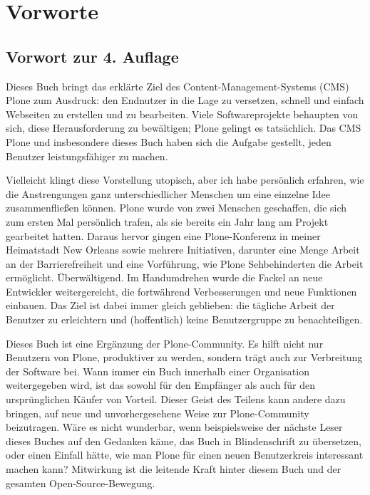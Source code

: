\documentclass[a4paper,12pt,ngerman]{manual}
\begin{document}
\resetcurrentobjects
\hypertarget{--doc-intro/intro}{}

\chapter{Vorworte}


\section{Vorwort zur 4. Auflage}

Dieses Buch bringt das erklärte Ziel des Content-Management-Systems (CMS)
Plone zum Ausdruck: den Endnutzer in die Lage zu versetzen, schnell und
einfach Webseiten zu erstellen und zu bearbeiten. Viele Softwareprojekte
behaupten von sich, diese Herausforderung zu bewältigen; Plone gelingt es
tatsächlich. Das CMS Plone und insbesondere dieses Buch haben sich die Aufgabe
gestellt, jeden Benutzer leistungsfähiger zu machen.

Vielleicht klingt diese Vorstellung utopisch, aber ich habe persönlich
erfahren, wie die Anstrengungen ganz unterschiedlicher Menschen um eine
einzelne Idee zusammenfließen können. Plone wurde von zwei Menschen
geschaffen, die sich zum ersten Mal persönlich trafen, als sie bereits ein
Jahr lang am Projekt gearbeitet hatten. Daraus hervor gingen eine
Plone-Konferenz in meiner Heimatstadt New Orleans sowie mehrere Initiativen,
darunter eine Menge Arbeit an der Barrierefreiheit und eine Vorführung, wie
Plone Sehbehinderten die Arbeit ermöglicht. Überwältigend. Im Handumdrehen
wurde die Fackel an neue Entwickler weitergereicht, die fortwährend
Verbesserungen und neue Funktionen einbauen. Das Ziel ist dabei immer gleich
geblieben: die tägliche Arbeit der Benutzer zu erleichtern und (hoffentlich)
keine Benutzergruppe zu benachteiligen.

Dieses Buch ist eine Ergänzung der Plone-Community. Es hilft nicht nur
Benutzern von Plone, produktiver zu werden, sondern trägt auch zur Verbreitung
der Software bei. Wann immer ein Buch innerhalb einer Organisation
weitergegeben wird, ist das sowohl für den Empfänger als auch für den
ursprünglichen Käufer von Vorteil. Dieser Geist des Teilens kann andere dazu
bringen, auf neue und unvorhergesehene Weise zur Plone-Community
beizutragen. Wäre es nicht wunderbar, wenn beispielsweise der nächste Leser
dieses Buches auf den Gedanken käme, das Buch in Blindenschrift zu übersetzen,
oder einen Einfall hätte, wie man Plone für einen neuen Benutzerkreis
interessant machen kann?  Mitwirkung ist die leitende Kraft hinter diesem Buch
und der gesamten Open-Source-Bewegung.
\end{document}
